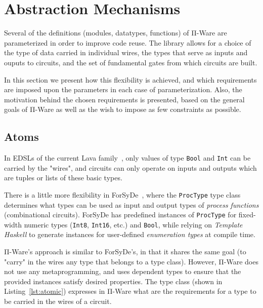     \section{Abstraction Mechanisms}
    \label{sec:circuit-abstraction}
        Several of the definitions (modules, datatypes, functions) of Π-Ware
        are parameterized in order to improve code reuse.
        The library allows for a choice of the type of data carried in individual wires,
        the types that serve as inputs and ouputs to circuits,
        and the set of fundamental gates from which circuits are built.

        In this section we present how this flexibility is achieved,
        and which requirements are imposed upon the parameters in each case of parameterization.
        Also, the motivation behind the chosen requirements is presented,
        based on the general goals of Π-Ware as well as the wish to impose as few constraints as possible.


        \subsection{Atoms}
        \label{subsec:atoms}
            In \acp{EDSL} of the current Lava family~\cite{observable-sharing-circuits},
            only values of type \texttt{Bool} and \texttt{Int}
            can be carried by the "wires", and circuits can only operate on inputs and outputs
            which are tuples or lists of these basic types.

            There is a little more flexibility in ForSyDe~\cite{forsyde1999},
            where the \texttt{ProcType} type class determines what types can be used
            as input and output types of \emph{process functions} (combinational circuits).
            ForSyDe has predefined instances of \texttt{ProcType} for fixed-width numeric types
            (\texttt{Int8}, \texttt{Int16}, etc.) and \texttt{Bool},
            while relying on \emph{Template Haskell} to generate instances for user-defined \emph{enumeration types}
            at compile time.

            Π-Ware's approach is similar to ForSyDe's, in that it shares the same goal
            (to "carry" in the wires any type that belongs to a type class).
            However, Π-Ware does not use any metaprogramming, and uses dependent types
            to ensure that the provided instances satisfy desired properties.
            The type class  (shown in Listing~\ref{lst:atomic})
            expresses in Π-Ware what are the requirements for a type to be carried in the wires of a circuit.

